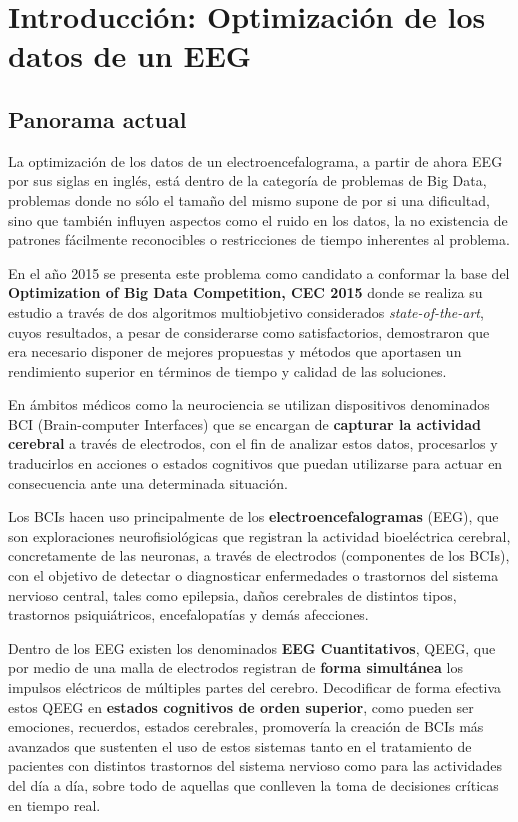 \chapter{Introducción: Optimización de los datos de un EEG}\label{Section:QEEG}

\section{Panorama actual}

La optimización de los datos de un electroencefalograma, a partir de ahora EEG por sus siglas en inglés, está dentro de la categoría de problemas de Big Data, problemas donde no sólo el tamaño del mismo supone de por si una dificultad, sino que también influyen aspectos como el ruido en los datos, la no existencia de patrones fácilmente reconocibles o restricciones de tiempo inherentes al problema.

En el año 2015 se presenta este problema como candidato a conformar la base del \textbf{Optimization of Big Data Competition, CEC 2015}\cite{EvolutionaryBigOpt} donde se realiza su estudio a través de dos algoritmos multiobjetivo considerados \textit{state-of-the-art}, cuyos resultados, a pesar de considerarse como satisfactorios, demostraron que era necesario disponer de mejores propuestas y métodos que aportasen un rendimiento superior en términos de tiempo y calidad de las soluciones.

En ámbitos médicos como la neurociencia se utilizan dispositivos denominados BCI (Brain-computer Interfaces)\cite{BCI} que se encargan de \textbf{capturar la actividad cerebral} a través de electrodos, con el fin de analizar estos datos, procesarlos y traducirlos en acciones o estados cognitivos que puedan utilizarse para actuar en consecuencia ante una determinada situación.

Los BCIs hacen uso principalmente de los \textbf{electroencefalogramas} (EEG), que son exploraciones neurofisiológicas que registran la actividad bioeléctrica cerebral, concretamente de las neuronas, a través de electrodos (componentes de los BCIs), con el objetivo de detectar o diagnosticar enfermedades o trastornos del sistema nervioso central\cite{EEG}, tales como epilepsia, daños cerebrales de distintos tipos, trastornos psiquiátricos, encefalopatías y demás afecciones\cite{EEG2}. 

Dentro de los EEG existen los denominados \textbf{EEG Cuantitativos}, QEEG\cite{QEEG}, que por medio de una malla de electrodos registran de \textbf{forma simultánea} los impulsos eléctricos de múltiples partes del cerebro. Decodificar de forma efectiva estos QEEG en \textbf{estados cognitivos de orden superior}\cite{EvolutionaryBigOpt}, como pueden ser emociones, recuerdos, estados cerebrales, promovería la creación de BCIs más avanzados que sustenten el uso de estos sistemas tanto en el tratamiento de pacientes con distintos trastornos del sistema nervioso como para las actividades del día a día, sobre todo de aquellas que conlleven la toma de decisiones críticas en tiempo real.

